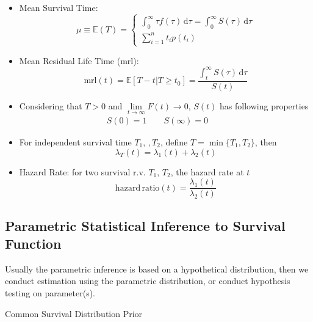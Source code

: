 \begin{itemize}[topsep=2pt,itemsep=0pt]
    \item Mean Survival Time:
    \begin{equation}
        \mu \equiv\mathbb{E}(T)=\begin{cases}
            \int _{0}^\infty \tau f(\tau) \,\mathrm{d}\tau =\int _0^\infty S(\tau) \,\mathrm{d}\tau\\
            \sum_{i=1}^nt_ip(t_i) 
        \end{cases}
    \end{equation}
    
    
    \item Mean Residual Life Time ($ \mathrm{mrl}  $):
    \begin{equation}
        \mathrm{mrl}(t)=\mathbb{E}[T-t|T\geq t_0]=\dfrac{\int _t^\infty S(\tau) \,\mathrm{d}\tau}{S(t)}  
    \end{equation}
    
    \item Considering that $ T>0 $ and $ \lim\limits_{t\to\infty}F(t)\to 0 $, $ S(t) $ has following properties
    \begin{align}
        S(0)=1\qquad S(\infty)=0\qquad
    \end{align}
    \item For independent survival time $ T_1,\,,T_2 $, define $ T=\min\{T_1,T_2\} $, then 
    \begin{equation}
        \lambda _T(t)=\lambda _1(t)+\lambda _2 (t)
    \end{equation}
    \item Hazard Rate: for two survival r.v. $ T_1,\,T_2 $, the hazard rate at $ t $
    \begin{equation}
        \mathrm{hazard\,ratio}(t)=\dfrac{\lambda_1(t) }{\lambda _2(t)}  
    \end{equation}
    
    
\end{itemize}


\subsection{Parametric Statistical Inference to Survival Function}
Usually the parametric inference is based on a hypothetical distribution, then we conduct estimation using the parametric distribution, or conduct hypothesis testing on parameter(s).

\begin{point}
    Common Survival Distribution Prior
\end{point}

